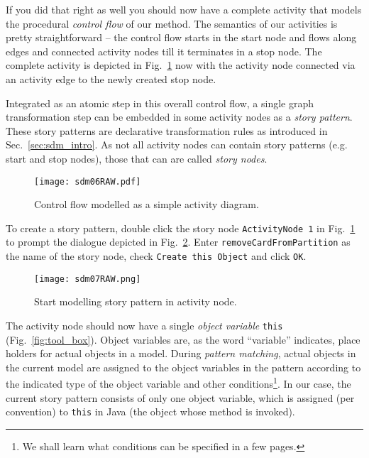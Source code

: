 If you did that right as well you should now have a complete activity that models the procedural \emph{control flow} of our method.  The semantics of our
activities is pretty straightforward -- the control flow starts in the start node and flows along edges and connected activity nodes till it terminates in a
stop node.  The complete activity is depicted in Fig.~\ref{fig:sdm_complete_control_flow_simple} now with the activity node connected via an activity edge to
the newly created stop node.

\label{story-pattern}
Integrated as an atomic step in this overall control flow, a single graph  transformation step can be embedded in some activity nodes as a
\emph{story pattern}.  These story patterns are declarative transformation rules as introduced in Sec.~\ref{sec:sdm_intro}.  As not all activity nodes can
contain story patterns (e.g. start and stop nodes), those that can are called \emph{story nodes}.

\begin{figure}[htp]
\begin{center}
  \texttt{[image: sdm06RAW.pdf]}
  \caption{Control flow modelled as a simple activity diagram.}  
  \label{fig:sdm_complete_control_flow_simple}
\end{center}
\end{figure}

To create a story pattern, double click the story node \texttt{ActivityNode 1} in Fig.~\ref{fig:sdm_complete_control_flow_simple} to prompt the dialogue
depicted in Fig.~\ref{fig:story_pattern}.  Enter \texttt{remove\-Card\-From\-Partition} as the name of the story node, check \texttt{Create this Object} and
click \texttt{OK}.

\begin{figure}[htpb]
\begin{center} 
  \texttt{[image: sdm07RAW.png]}
  \caption{Start modelling story pattern in activity node.}  
  \label{fig:story_pattern}
\end{center}
\end{figure}

The activity node should now have a single \emph{object variable} \texttt{this} (Fig.~\ref{fig:tool_box}). Object variables are, as the
word ``variable'' indicates, place holders for actual objects in a model.  During \emph{pattern matching},  actual objects in the 
current model are assigned to the object variables in the pattern according to  the indicated type of the object variable and other conditions\footnote{We shall
learn what conditions can be specified in a few pages.}.  In our case, the current story pattern consists of only one object variable, which is assigned (per
convention) to \texttt{this} in Java (the object whose method is invoked).

